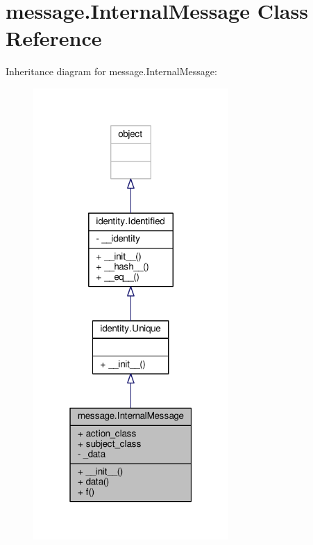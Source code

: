 \hypertarget{classmessage_1_1InternalMessage}{}\section{message.\+Internal\+Message Class Reference}
\label{classmessage_1_1InternalMessage}


Inheritance diagram for message.\+Internal\+Message\+:
\nopagebreak
\begin{figure}[H]
\begin{center}
\leavevmode
\includegraphics[width=211pt]{classmessage_1_1InternalMessage__inherit__graph}
\end{center}
\end{figure}



